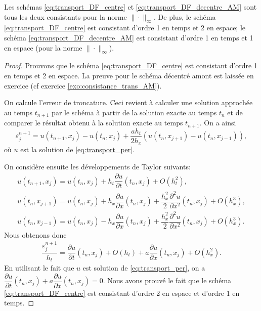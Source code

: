 \documentclass[12pt,a4paper,twoside]{article}
\begin{document}
\begin{proposition}
  \label{prop:consistance_2_schemas}
  Les sch\'emas \eqref{eq:transport_DF_centre} et \eqref{eq:transport_DF_decentre_AM}
  sont tous les deux consistants pour la norme $\| \cdot \|_{\infty}$.
  De plus, le sch\'ema \eqref{eq:transport_DF_centre} est consistant d'ordre 1
  en temps et 2 en espace;
  le sch\'ema \eqref{eq:transport_DF_decentre_AM} est consistant d'ordre 1
  en temps et 1 en espace (pour la norme $\| \cdot \|_{\infty}$).
\end{proposition}


\begin{proof}
  Prouvons que le sch\'ema \eqref{eq:transport_DF_centre} est consistant
  d'ordre 1 en temps et 2 en espace.
  La preuve pour le sch\'ema d\'ecentr\'e amont est laiss\'ee en exercice
  (cf exercice \ref{exo:consistance_trans_AM}).

  On calcule l'erreur de troncature. Ceci revient \`a 
  calculer une solution approch\'ee au temps $t_{n+1}$ par le sch\'ema \`a partir
  de la solution exacte au temps $t_n$ et de comparer le r\'esultat
  obtenu \`a la solution exacte au temps $t_{n+1}$.
  On a ainsi
  \[
    \varepsilon_j^{n+1} = u(t_{n+1},x_j) - u(t_n,x_j)
    + \dfrac{a h_t}{2 h_x} (u(t_n, x_{j+1}) - u(t_n, x_{j-1})) ,
  \]
  o\`u $u$ est la solution de \eqref{eq:transport_per}.

  On consid\`ere ensuite les d\'eveloppements de Taylor suivants:
  \begin{align*}
    u(t_{n+1} , x_j) = u(t_n , x_j) + h_t \dfrac{\partial u}{\partial t} (t_n , x_j)
    + O(h_t^2) ,
    \\
    u(t_n , x_{j+1} ) = u(t_n , x_{j} ) + h_x \dfrac{\partial u}{\partial x}(t_n, x_j)
    + \dfrac{h_x^2}{2} \dfrac{\partial^2 u}{\partial x^2}(t_n, x_j)
    + O(h_x^3) ,
    \\
    u(t_{n} , x_{j-1} ) = u(t_n , x_{j} ) - h_x \dfrac{\partial u}{\partial x}(t_n, x_j)
    + \dfrac{h_x^2}{2} \dfrac{\partial^2 u}{\partial x^2}(t_n, x_j)
    + O(h_x^3) .
  \end{align*}
  Nous obtenons donc
  \begin{align*}
    \dfrac{\varepsilon_j^{n+1}}{h_t} = \dfrac{\partial u}{\partial t}(t_n, x_j)
    + O (h_t) + a \dfrac{\partial u}{\partial x}(t_n, x_j) + O (h_x^2) .
  \end{align*}
  En utilisant le fait que $u$ est solution de \eqref{eq:transport_per},
  on a 
  $\dfrac{\partial u}{\partial t}(t_n, x_j) + a \dfrac{\partial u}{\partial x}(t_n, x_j) = 0$.
  Nous avons prouv\'e le fait que le sch\'ema \eqref{eq:transport_DF_centre}
  est consistant d'ordre 2 en espace et d'ordre 1 en temps.
\end{proof}
\end{document}
